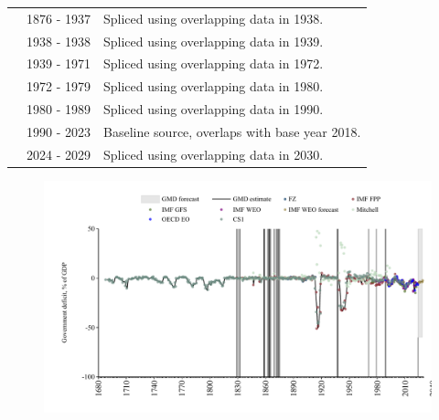 \documentclass[12pt,a4paper,landscape]{article}
\begin{document}
\begin{adjustbox}{max totalsize={\paperwidth}{\paperheight},center}
\begin{minipage}[t][\textheight][t]{\textwidth}
\begin{table}[H]
\begin{tabular}{|l|l|l|}
\rowcolor{lightgray}\cite{IMF_FPP}& 1876 - 1937 &Spliced using overlapping data in 1938.\\
\rowcolor{white}\cite{CS1_GBR}& 1938 - 1938 &Spliced using overlapping data in 1939.\\
\rowcolor{lightgray}\cite{IMF_FPP}& 1939 - 1971 &Spliced using overlapping data in 1972.\\
\rowcolor{white}\cite{IMF_GFS}& 1972 - 1979 &Spliced using overlapping data in 1980.\\
\rowcolor{lightgray}\cite{IMF_WEO}& 1980 - 1989 &Spliced using overlapping data in 1990.\\
\rowcolor{white}\cite{OECD_EO}& 1990 - 2023 &Baseline source, overlaps with base year 2018.\\
\rowcolor{lightgray}\cite{IMF_WEO_forecast}& 2024 - 2029 &Spliced using overlapping data in 2030.\\
\hline
\end{tabular}
\end{table}
\begin{figure}[H]
\centering
\includegraphics[width=\textwidth,height=0.6\textheight,keepaspectratio]{graphs/GBR_govdef_GDP.pdf}
\end{figure}
\end{minipage}
\end{adjustbox}
\end{document}
